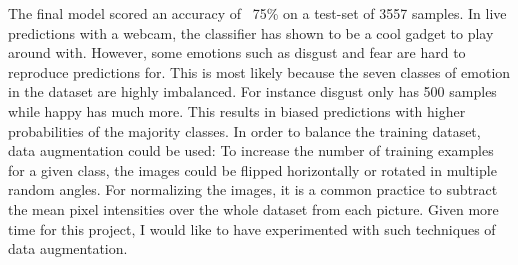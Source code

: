 \documentclass[twoside]{article}
\begin{document}
\begin{multicols}{2}
The final model scored an accuracy of ~75\% on a test-set of 3557 samples. In live predictions with a webcam, the classifier has shown to be a cool gadget to play around with. However, some emotions such as disgust and fear are hard to reproduce predictions for. This is most likely because the seven classes of emotion in the dataset are highly imbalanced. For instance disgust only has 500 samples while happy has much more. This results in biased predictions with higher probabilities of the majority classes. In order to balance the training dataset, data augmentation could be used: To increase the number of training examples for a given class, the images could be flipped horizontally or rotated in multiple random angles. For normalizing the images, it is a common practice to subtract the mean pixel intensities over the whole dataset from each picture. Given more time for this project, I would like to have experimented with such techniques of data augmentation. 




%
%
%	
%    
%
% 






\end{multicols}
\end{document}
